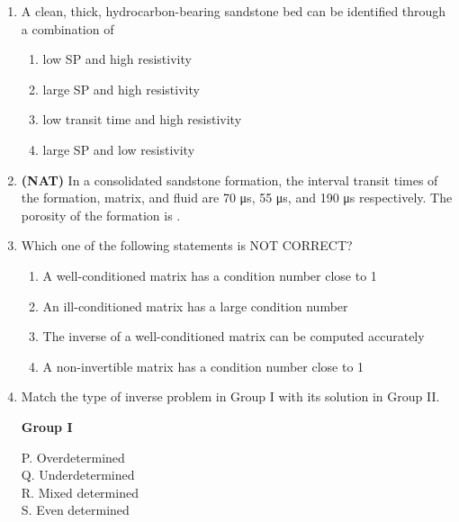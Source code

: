 \documentclass[journal,12pt,onecolumn]{IEEEtran}
\theoremstyle{remark}
\begin{document}
\begin{enumerate}
\begin{multicols}{4}
\begin{enumerate}
\item broader  
\item tighter  
\item unaltered  
\item flat  
\end{enumerate}
\end{multicols}

\item A clean, thick, hydrocarbon-bearing sandstone bed can be identified through a combination of

\begin{enumerate}
\item low SP and high resistivity  
\item large SP and high resistivity  
\item low transit time and high resistivity  
\item large SP and low resistivity  
\end{enumerate}

\item \textbf{(NAT)} In a consolidated sandstone formation, the interval transit times of the formation, matrix, and fluid are 70 μs, 55 μs, and 190 μs respectively. The porosity of the formation is \underline{\hspace{2cm}}.

\item Which one of the following statements is NOT CORRECT?

\begin{enumerate}
\item A well-conditioned matrix has a condition number close to 1  
\item An ill-conditioned matrix has a large condition number  
\item The inverse of a well-conditioned matrix can be computed accurately  
\item A non-invertible matrix has a condition number close to 1  
\end{enumerate}

\item Match the type of inverse problem in Group I with its solution in Group II.

\begin{multicols}{2}
\textbf{Group I}  
\begin{flushleft}
P. Overdetermined\\
Q. Underdetermined\\
R. Mixed determined\\
S. Even determined
\end{flushleft}


\end{multicols}
\end{enumerate}
\end{document}
